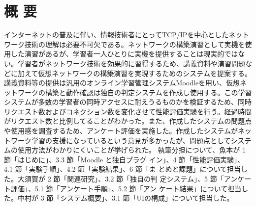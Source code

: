 \section*{\center 概 要}

インターネットの普及に伴い、情報技術者にとってTCP/IPを中心としたネットワーク技術の理解は必要不可欠である。ネットワークの構築演習として実機を使用した演習があるが、学習者一人ひとりに実機を提供することは現実的ではない。学習者がネットワーク技術を効果的に習得するため、講義資料や演習問題などに加えて仮想ネットワークの構築演習を実現するためのシステムを提案する。講義資料等の提供は汎用のオンライン学習管理システムMoodleを用い、仮想ネットワークの構築と動作確認は独自の判定システムを作成し使用する。この学習システムが多数の学習者の同時アクセスに耐えうるものかを検証するため、同時リクエスト数およびコネクション数を変化させて性能評価実験を行う。経過時間がリクエスト数と比例してることがわかった。また、作成したシステムの問題点や使用感を調査するため、アンケート評価を実施した。作成したシステムがネットワーク学習の支援になっているという意見が多かったが、問題点としてシステムの使用方法がわかりにくいことが挙げられた。
執筆分担について、魚本が 1 節「はじめに」、3.3 節「Moodle と独自プラグ イン」、4 節「性能評価実験」、4.1 節「実験手順」、4.2 節「実験結果」、6 節「ま とめと課題」について担当した。大須賀が 2 節「関連研究」、3.2 節「独自の判 定システム」、5 節「アンケート評価」、5.1 節「アンケート手順」、5.2 節「アン ケート結果」について担当した。中村が 3 節「システム概要」、3.1 節「UIの構成」について担当した。
